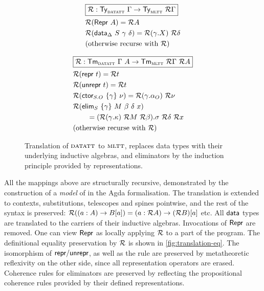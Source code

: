 \begin{figure}
\begin{minipage}[t]{0.5\textwidth}
\begin{align*}
&\boxed{\mathcal{R} : \textsf{Ty}_{{\textsc{datatt}}}\ \Gamma \to \textsf{Ty}_{{\textsc{mltt}}}\ \mathcal{R} \Gamma} \\
&\mathcal{R} (\textsf{Repr}\ A) = \mathcal{R} A \\
&\mathcal{R} (\textsf{data}_{\Delta}\ S\ \gamma\ \delta) = \mathcal{R} (\gamma.X)\ \mathcal{R} \delta \\
&\text{(otherwise recurse with $\mathcal{R}$)}
\end{align*}
\end{minipage}%
\begin{minipage}[t]{0.5\textwidth}
\begin{align*}
&\boxed{\mathcal{R} : \textsf{Tm}_{{\textsc{datatt}}}\ \Gamma\ A \to \textsf{Tm}_{{\textsc{mltt}}}\ \mathcal{R} \Gamma\ \mathcal{R} A} \\
&\mathcal{R} (\textsf{repr}\ t) = \mathcal{R} t \\
&\mathcal{R} (\textsf{unrepr}\ t) = \mathcal{R} t \\
&\mathcal{R} (\textsf{ctor}_{S.O}\ \{\gamma\}\ \nu) = \mathcal{R} (\gamma.\alpha_O)\ \mathcal{R}\nu \\
&\mathcal{R} (\textsf{elim}_{S}\ \{\gamma\}\ M\ \beta\ \delta\ x)  \\ &\qquad = (\mathcal{R} (\gamma.\kappa)\ \mathcal{R} M\ \mathcal{R} \beta).\sigma\ \mathcal{R}\delta\ \mathcal{R} x \\
&\text{(otherwise recurse with $\mathcal{R}$)}
\end{align*}
\end{minipage}
\caption{Translation of ${\textsc{datatt}}$ to ${\textsc{mltt}}$, replaces data types
with their underlying inductive algebras, and eliminators by the induction
principle provided by representations.}
\label{fig:translation}
\end{figure}

All the mappings above are structurally recursive, demonstrated by the construction
of a  \emph{model} of \lambdadata in the Agda formalisation. The translation is
extended to contexts, substitutions, telescopes and spines pointwise, and
the rest of the syntax is preserved: $\mathcal{R}((a : A) \to B[a]) = (a : \mathcal{R} A) \to (\mathcal{R}
B)[a]$ etc. All $\textsf{data}$ types are translated to the carriers of their inductive
algebras. Invocations of $\textsf{Repr}$ are removed. One can view $\textsf{Repr}$ as locally
applying $\mathcal{R}$ to a part of the program. The definitional equality preservation
by $\mathcal{R}$ is shown in \cref{fig:translation-eq}. The isomorphism of
$\textsf{repr}/\textsf{unrepr}$, as well as the rule \hyperlink{Repr-Data}{} are preserved by
metatheoretic reflexivity on the other side, since all representation operators
are erased. Coherence rules for eliminators are preserved by reflecting the
propositional coherence rules provided by their defined representations.

